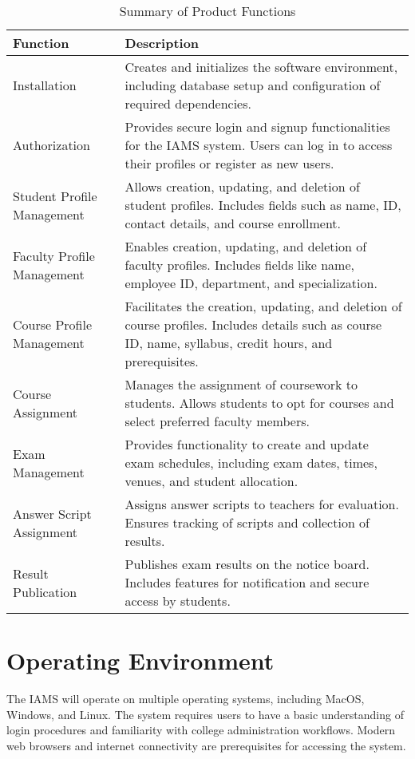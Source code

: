 \documentclass{scrreprt}
\begin{document}
\begin{table}[h!]
    \centering
    \begin{tabular}{|p{4cm}|p{9cm}|}
        \hline
        \textbf{Function} & \textbf{Description} \\
        \hline
        Installation & Creates and initializes the software environment, including database setup and configuration of required dependencies. \\
        \hline
        Authorization & Provides secure login and signup functionalities for the IAMS system. Users can log in to access their profiles or register as new users. \\
        \hline
        Student Profile Management & Allows creation, updating, and deletion of student profiles. Includes fields such as name, ID, contact details, and course enrollment. \\
        \hline
        Faculty Profile Management & Enables creation, updating, and deletion of faculty profiles. Includes fields like name, employee ID, department, and specialization. \\
        \hline
        Course Profile Management & Facilitates the creation, updating, and deletion of course profiles. Includes details such as course ID, name, syllabus, credit hours, and prerequisites. \\
        \hline
        Course Assignment & Manages the assignment of coursework to students. Allows students to opt for courses and select preferred faculty members. \\
        \hline
        Exam Management & Provides functionality to create and update exam schedules, including exam dates, times, venues, and student allocation. \\
        \hline
        Answer Script Assignment & Assigns answer scripts to teachers for evaluation. Ensures tracking of scripts and collection of results. \\
        \hline
        Result Publication & Publishes exam results on the notice board. Includes features for notification and secure access by students. \\
        \hline
    \end{tabular}
    \caption{Summary of Product Functions}
    \label{tab:product_functions}
\end{table}


\section{Operating Environment}
The IAMS will operate on multiple operating systems, including MacOS, Windows, and Linux. The system requires users to have a basic understanding of login procedures and familiarity with college administration workflows. Modern web browsers and internet connectivity are prerequisites for accessing the system.
\end{document}
